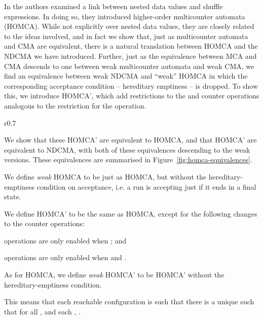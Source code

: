 In \cite{BjorklundB07} the authors examined a link between nested data values and shuffle expressions.  In doing so, they introduced higher-order multicounter automata (HOMCA).  While not explicitly over nested data values, they are closely related to the ideas involved, and in fact we show that, just as multicounter automata and CMA are equivalent, there is a natural translation between HOMCA and the NDCMA we have introduced.  Further, just as the equivalence between MCA and CMA descends to one between weak multicounter automata and weak CMA, we find an equivalence between weak NDCMA and ``weak'' HOMCA in which the corresponding acceptance condition -- hereditary emptiness -- is dropped.  
To show this, we introduce HOMCA', which add restrictions to the  and  counter operations analogous to the restriction for the  operation.
\begin{wrapfigure}{r}{0.7\textwidth}
   \vspace{-30pt}

   \vspace{-10pt}
\caption{A diagram showing translations between HOMCA, HOMCA', NDCMA, and their weak counterparts.}
   \vspace{-10pt}
\label{fig:homca-equivalences}
\end{wrapfigure}
We show that these HOMCA' are equivalent to HOMCA, and that HOMCA' are equivalent to NDCMA, with both of these equivalences descending to the weak versions.  These equivalences are summarised in Figure~\ref{fig:homca-equivalences}.

\begin{definition}
We define \emph{weak} HOMCA to be just as HOMCA, but without the hereditary-emptiness condition on acceptance,  i.e. a run is accepting just if it ends in a final state.
\end{definition}


\begin{definition}
We define HOMCA' to be the same as HOMCA, except for the following changes to the counter operations:
\begin{inparaenum}[(i)]
\item  operations are only enabled when ; and
\item  operations are only enabled when  and .
\end{inparaenum}

As for HOMCA, we define \emph{weak} HOMCA' to be HOMCA' without the hereditary-emptiness condition. 
\end{definition}
This means that each reachable configuration  is such that there is a unique  such that for all ,  and each , .

